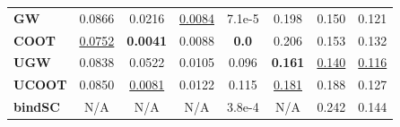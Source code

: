 \begin{table}[t]
\begin{center}
{\begin{tabular}{lccccccc}
\multicolumn{1}{l|}{\textbf{GW}}     & 0.0866                                                          & 0.0216                                                         & {\underline{0.0084}}                                                   & 7.1e-5                                                                         & 0.198                                                       & 0.150                                                             & 0.121                                                         \\
\multicolumn{1}{l|}{\textbf{COOT}}   & {\underline{0.0752}}                                                    & \textbf{0.0041}                                                & 0.0088                                                         & \textbf{0.0}                                                                   & 0.206                                                       & 0.153                                                             & 0.132                                                         \\
\multicolumn{1}{l|}{\textbf{UGW}}    & 0.0838                                                          & 0.0522                                                         & 0.0105                                                         & 0.096                                                                          & \textbf{0.161}                                              & {\underline{0.140}}                                                       & {\underline{0.116}}                                                   \\
\multicolumn{1}{l|}{\textbf{UCOOT}}  & 0.0850                                                          & {\underline{0.0081}}                                                   & 0.0122                                                         & 0.115                                                                          & {\underline{0.181}}                                                 & 0.188                                                             & 0.127                                                         \\
\multicolumn{1}{l|}{\textbf{bindSC}} & N/A                                                             & N/A                                                            & N/A                                                            & 3.8e-4                                                                         & N/A                                                         & 0.242                                                             & 0.144                                                         \\ \hline

\end{tabular}}
\end{center}
\end{table}
